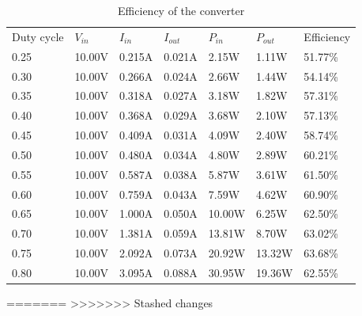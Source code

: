\begin{table}[H]
\begin{center}
\caption {Efficiency of the converter} \label{tab:Efficiencyandpowers} 
\vspace{-1mm}
\begin{tabular}{|l|l|l|l|l|l|l|}
\cline{1-7}
Duty cycle & $V_{in}$ & $I_{in}$ & $I_{out}$ & $P_{in}$	& $P_{out}$ & Efficiency \\ \cline{1-7}
0.25 &	10.00V &	0.215A &	0.021A &	2.15W &	1.11W &	51.77\% \\ \cline{1-7}
0.30 &	10.00V &	0.266A &	0.024A &	2.66W &	1.44W &	54.14\% \\ \cline{1-7}
0.35 &	10.00V &	0.318A &	0.027A &	3.18W &	1.82W &	57.31\% \\ \cline{1-7}
0.40 &	10.00V &	0.368A &	0.029A &	3.68W &	2.10W &	57.13\% \\ \cline{1-7}
0.45 &	10.00V &	0.409A &	0.031A &	4.09W &	2.40W &	58.74\% \\ \cline{1-7}
0.50 &	10.00V &	0.480A &	0.034A &	4.80W &	2.89W &	60.21\% \\ \cline{1-7}
0.55 &	10.00V &	0.587A &	0.038A &	5.87W &	3.61W &	61.50\% \\ \cline{1-7}
0.60 &	10.00V &	0.759A &	0.043A &	7.59W &	4.62W &	60.90\% \\ \cline{1-7}
0.65 &	10.00V &	1.000A &	0.050A &	10.00W &6.25W &	62.50\% \\ \cline{1-7}
0.70 &	10.00V &	1.381A &	0.059A &	13.81W &8.70W &	63.02\% \\ \cline{1-7}
0.75 &	10.00V &	2.092A &	0.073A &	20.92W &13.32W&	63.68\% \\ \cline{1-7}
0.80 &	10.00V &	3.095A &	0.088A &	30.95W &19.36W&	62.55\% \\ \cline{1-7}
\end{tabular}
\end{center}
\end{table}
=======
>>>>>>> Stashed changes
